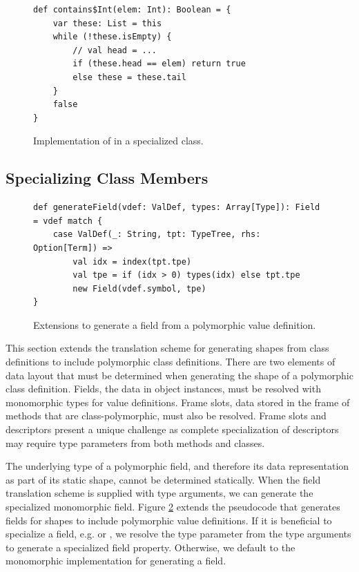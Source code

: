 \begin{figure}[!htb]
\begin{verbatim}
def contains$Int(elem: Int): Boolean = {
	var these: List = this
	while (!these.isEmpty) {
		// val head = ...
		if (these.head == elem) return true
		else these = these.tail
	}
	false
}	
\end{verbatim}
\caption{Implementation of  in a specialized  class.}
\label{impl:cons-contains-specialized}
\end{figure}

\subsection{Specializing Class Members}

\begin{figure}[!htb]
\begin{verbatim}
def generateField(vdef: ValDef, types: Array[Type]): Field = vdef match {
	case ValDef(_: String, tpt: TypeTree, rhs: Option[Term]) => 
		val idx = index(tpt.tpe)
		val tpe = if (idx > 0) types(idx) else tpt.tpe
		new Field(vdef.symbol, tpe)
}
\end{verbatim}
\caption{Extensions to generate a field from a polymorphic value definition.}
\label{impl:generate-poly-field}
\end{figure}

This section extends the translation scheme for generating shapes from class definitions to include polymorphic class definitions.
There are two elements of data layout that must be determined when generating the shape of a polymorphic class definition.
Fields, the data in object instances, must be resolved with monomorphic types for value definitions.
Frame slots, data stored in the frame of methods that are class-polymorphic, must also be resolved.
Frame slots and descriptors present a unique challenge as complete specialization of descriptors may require type parameters from both methods and classes.

The underlying type of a polymorphic field, and therefore its data representation as part of its static shape, cannot be determined statically.
When the field translation scheme is supplied with type arguments, we can generate the specialized monomorphic field.
Figure \ref{impl:generate-poly-field} extends the pseudocode that generates fields for shapes to include polymorphic value definitions.
If it is beneficial to specialize a field, e.g.  or , we resolve the type parameter from the type arguments to generate a specialized field property.
Otherwise, we default to the monomorphic implementation for generating a field.

